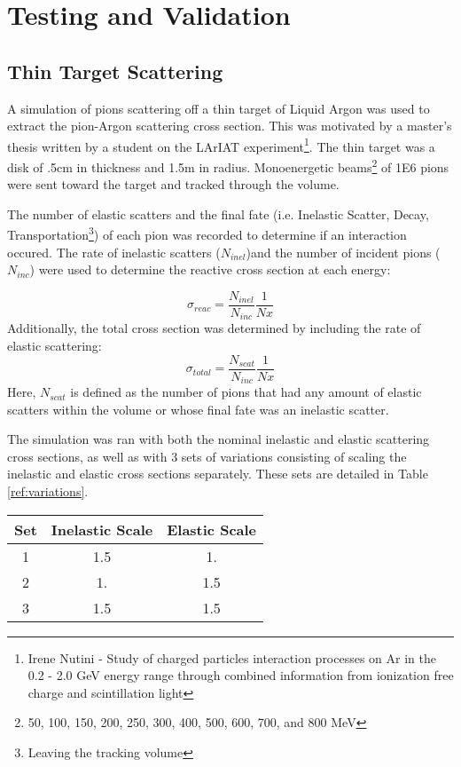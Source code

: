 \documentclass[12pt]{article}
\begin{document}
\section{Testing and Validation}

\subsection{Thin Target Scattering}
A simulation of pions scattering off a thin target of Liquid Argon was used to extract the pion-Argon scattering cross section. This was motivated by a master's thesis written by a student on the LArIAT experiment\footnote{Irene Nutini - Study of charged particles interaction
processes on Ar in the 0.2 - 2.0 GeV
energy range through combined
information from ionization free charge
and scintillation light}. The thin target was a disk of .5cm in thickness and 1.5m in radius. Monoenergetic beams\footnote{{50, 100, 150, 200, 250, 300, 400, 500, 600, 700, and 800} MeV } of 1E6 pions were sent toward the target and tracked through the volume. 

The number of elastic scatters and the final fate (i.e. Inelastic Scatter, Decay, Transportation\footnote{Leaving the tracking volume}) of each pion was recorded to determine if an interaction occured. The rate of inelastic scatters ($N_{inel}$)and the number of incident pions ($N_{inc}$) were used to determine the reactive cross section at each energy: 

\begin{equation}\label{ref:reactive_xsec}
\sigma_{reac} = \frac{N_{inel}}{N_{inc}}\frac{1}{Nx}
\end{equation}
Additionally, the total cross section was determined by including the rate of elastic scattering:
\begin{equation}\label{ref:total_xsec}
\sigma_{total} = \frac{N_{scat}}{N_{inc}}\frac{1}{Nx}
\end{equation}
Here, $N_{scat}$ is defined as the number of pions that had any amount of elastic scatters within the volume or whose final fate was an inelastic scatter. 

The simulation was ran with both the nominal inelastic and elastic scattering cross sections, as well as with 3 sets of variations consisting of scaling the inelastic and elastic cross sections separately. These sets are detailed in Table \ref{ref:variations}. 

\begin{center}\label{ref:variations}
  \begin{tabular}{| c | c  c |}
  \hline
  Set & Inelastic Scale & Elastic Scale  \\
  \hline
  1 & 1.5 & 1. \\ 
  \hline
  2 & 1.  & 1.5 \\
  \hline	
  3 & 1.5 & 1.5 \\
  \hline  
  \end{tabular}
\end{center}
\end{document}
